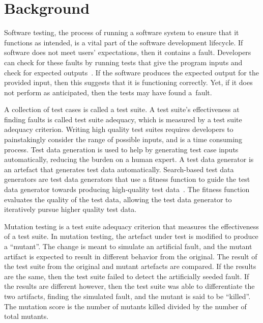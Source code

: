 \section{Background}\label{sec:background}


Software testing, the process of running a software system to ensure that it functions as intended, is a vital part of
the software development lifecycle. If software does not meet users' expectations, then it contains a fault.  Developers
can check for these faults by running tests that give the program inputs and check for expected
outputs~\cite{ammann2008}.  If the software produces the expected output for the provided input, then this suggests that
it is functioning correctly.  Yet, if it does not perform as anticipated, then the tests may have found \mbox{a fault}.


A collection of test cases is called a test suite. A test suite's effectiveness at finding faults is called test suite
adequacy, which is measured by a test suite adequacy criterion.  Writing high quality test suites requires developers to
painstakingly consider the range of possible inputs, and is a time consuming process. Test data generation is used to
help by generating test case inputs automatically, reducing the burden on a human expert. A test data generator is an
artefact that generates test data automatically.  Search-based test data generators are test data generators that use a
fitness function to guide the test data generator towards producing high-quality test data~\cite{STVR:STVR294}. The
fitness function evaluates the quality of the test data, allowing the test data generator to iteratively pursue higher
quality test data.


Mutation testing is a test suite adequacy criterion that measures the effectiveness of a test suite. In mutation
testing, the artefact under test is modified to produce a ``mutant''. The change is meant to simulate an artificial
fault, and the mutant artifact is expected to result in different behavior from the original. The result of the test
suite from the original and mutant artefacts are compared. If the results are the same, then the test suite failed to
detect the artificially seeded fault. If the results are different however, then the test suite was able to
differentiate the two artifacts, finding the simulated fault, and the mutant is said to be ``killed''.  The mutation
score is the number of mutants killed divided by the number of total mutants.

